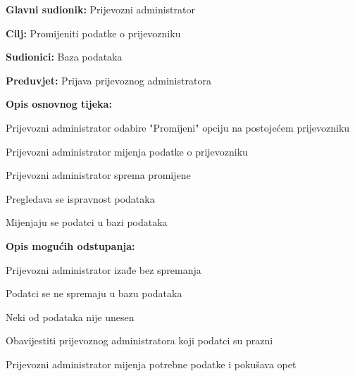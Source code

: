 			\noindent {}
			\begin{packed_item}
				
				\item \textbf{Glavni sudionik: }Prijevozni administrator
				\item  \textbf{Cilj:} Promijeniti podatke o prijevozniku
				\item  \textbf{Sudionici:} Baza podataka
				\item  \textbf{Preduvjet:} Prijava prijevoznog administratora
				\item  \textbf{Opis osnovnog tijeka:}
				
				\item[] \begin{packed_enum}
					
					\item Prijevozni administrator odabire "Promijeni" opciju na postojećem prijevozniku
					\item Prijevozni administrator mijenja podatke o prijevozniku
					\item Prijevozni administrator sprema promijene
					\item Pregledava se ispravnost podataka
					\item Mijenjaju se podatci u bazi podataka
				\end{packed_enum}
				
				\item  \textbf{Opis mogućih odstupanja:}
				
				\item[] \begin{packed_item}
					
					\item[3.a] Prijevozni administrator izađe bez spremanja
					\item[] \begin{packed_enum}
						
						\item Podatci se ne spremaju u bazu podataka
						
					\end{packed_enum}
					
					\item[4.a] Neki od podataka nije unesen
					\item[] \begin{packed_enum}
						
						\item Obavijestiti prijevoznog administratora koji podatci su prazni
						\item Prijevozni administrator mijenja potrebne podatke i pokušava opet
						
					\end{packed_enum}
					
				\end{packed_item}
			\end{packed_item}
			
